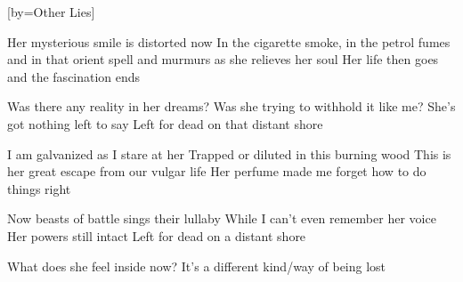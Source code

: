 [by={Other Lies}]

  \chordsoff
  \beginverse
  Her mysterious smile is distorted now 
  In the cigarette smoke, in the petrol fumes
  and in that orient spell and murmurs as she relieves her soul
  Her life then goes and the fascination ends 
  \endverse

  \beginverse  
  Was there any reality in her dreams? 
  Was she trying to withhold it like me? 
  She’s got nothing left to say 
  Left for dead on that distant shore
  \endverse

  \beginverse
  I am galvanized as I stare at her
  Trapped or diluted in this burning wood
  This is her great escape from our vulgar life
  Her perfume made me forget how to do things right
  \endverse

  \beginverse
  Now beasts of battle sings their lullaby
  While I can’t even remember her voice
  Her powers still intact
  Left for dead on a distant shore
  \endverse

  \beginverse  
  What does she feel inside now?
  It’s a different kind/way of being lost
  \endverse
\endsong

